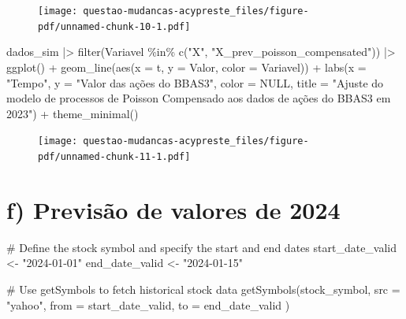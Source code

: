 \documentclass[
  letterpaper,
  DIV=11,
  numbers=noendperiod]{scrreprt}
\newenvironment{Shaded}{\begin{snugshade}}{\end{snugshade}}
\newcommand{\AttributeTok}[1]{\textcolor[rgb]{0.40,0.45,0.13}{#1}}
\newcommand{\CommentTok}[1]{\textcolor[rgb]{0.37,0.37,0.37}{#1}}
\newcommand{\ConstantTok}[1]{\textcolor[rgb]{0.56,0.35,0.01}{#1}}
\newcommand{\FunctionTok}[1]{\textcolor[rgb]{0.28,0.35,0.67}{#1}}
\newcommand{\NormalTok}[1]{\textcolor[rgb]{0.00,0.23,0.31}{#1}}
\newcommand{\OtherTok}[1]{\textcolor[rgb]{0.00,0.23,0.31}{#1}}
\newcommand{\SpecialCharTok}[1]{\textcolor[rgb]{0.37,0.37,0.37}{#1}}
\newcommand{\StringTok}[1]{\textcolor[rgb]{0.13,0.47,0.30}{#1}}
\begin{document}
\begin{figure}[H]

{\centering \texttt{[image: questao-mudancas-acypreste\_files/figure-pdf/unnamed-chunk-10-1.pdf]}

}

\end{figure}

\begin{Shaded}
\begin{Highlighting}[]
\NormalTok{dados\_sim }\SpecialCharTok{|\textgreater{}}
    \FunctionTok{filter}\NormalTok{(Variavel  }\SpecialCharTok{\%in\%} \FunctionTok{c}\NormalTok{(}\StringTok{"X"}\NormalTok{, }\StringTok{"X\_prev\_poisson\_compensated"}\NormalTok{)) }\SpecialCharTok{|\textgreater{}}
    \FunctionTok{ggplot}\NormalTok{() }\SpecialCharTok{+}
    \FunctionTok{geom\_line}\NormalTok{(}\FunctionTok{aes}\NormalTok{(}\AttributeTok{x =}\NormalTok{ t, }\AttributeTok{y =}\NormalTok{ Valor, }\AttributeTok{color =}\NormalTok{ Variavel)) }\SpecialCharTok{+}
    \FunctionTok{labs}\NormalTok{(}\AttributeTok{x =} \StringTok{"Tempo"}\NormalTok{,}
         \AttributeTok{y =} \StringTok{"Valor das ações do BBAS3"}\NormalTok{,}
         \AttributeTok{color =} \ConstantTok{NULL}\NormalTok{,}
         \AttributeTok{title =} \StringTok{"Ajuste do modelo de processos de Poisson Compensado}
\StringTok{          aos dados de ações do BBAS3 em 2023"}\NormalTok{) }\SpecialCharTok{+}
    \FunctionTok{theme\_minimal}\NormalTok{()}
\end{Highlighting}
\end{Shaded}

\begin{figure}[H]

{\centering \texttt{[image: questao-mudancas-acypreste\_files/figure-pdf/unnamed-chunk-11-1.pdf]}

}

\end{figure}

\hypertarget{f-previsuxe3o-de-valores-de-2024}{%
\section*{f) Previsão de valores de
2024}\label{f-previsuxe3o-de-valores-de-2024}}


\begin{Shaded}
\begin{Highlighting}[]
\CommentTok{\# Define the stock symbol and specify the start and end dates}
\NormalTok{start\_date\_valid }\OtherTok{\textless{}{-}} \StringTok{"2024{-}01{-}01"}
\NormalTok{end\_date\_valid }\OtherTok{\textless{}{-}} \StringTok{"2024{-}01{-}15"}

\CommentTok{\# Use getSymbols to fetch historical stock data}
\FunctionTok{getSymbols}\NormalTok{(stock\_symbol,}
    \AttributeTok{src =} \StringTok{"yahoo"}\NormalTok{,}
    \AttributeTok{from =}\NormalTok{ start\_date\_valid,}
    \AttributeTok{to =}\NormalTok{ end\_date\_valid}
\NormalTok{)}
\end{Highlighting}
\end{Shaded}
\end{document}
